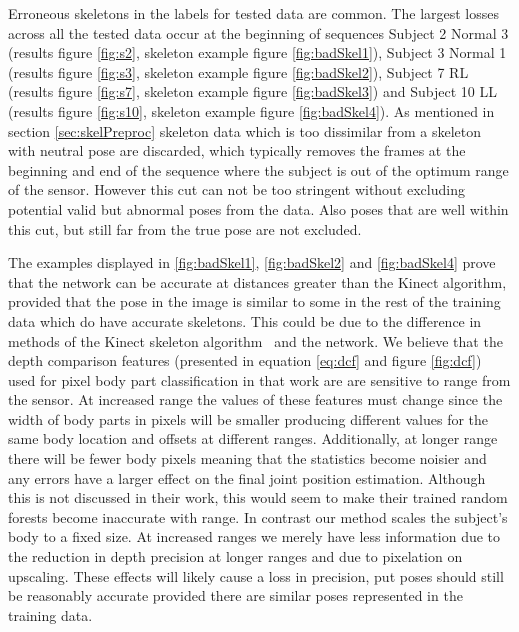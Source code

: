 \documentclass[11pt]{article} %
\begin{document}
Erroneous skeletons in the labels for tested data are common. The largest losses across all the tested data occur at the beginning of sequences Subject 2 Normal 3 (results figure \ref{fig:s2}, skeleton example figure \ref{fig:badSkel1}), Subject 3 Normal 1 (results figure \ref{fig:s3}, skeleton example figure \ref{fig:badSkel2}), Subject 7 RL (results figure \ref{fig:s7}, skeleton example figure \ref{fig:badSkel3}) and Subject 10 LL (results figure \ref{fig:s10}, skeleton example figure \ref{fig:badSkel4}). As mentioned in section \ref{sec:skelPreproc} skeleton data which is too dissimilar from a skeleton with neutral pose are discarded, which typically removes the frames at the beginning and end of the sequence where the subject is out of the optimum range of the sensor. However this cut can not be too stringent without excluding potential valid but abnormal poses from the data. Also poses that are well within this cut, but still far from the true pose are not excluded. 

The examples displayed in \ref{fig:badSkel1}, \ref{fig:badSkel2} and \ref{fig:badSkel4} prove that the network can be accurate at distances greater than the Kinect algorithm, provided that the pose in the image is similar to some in the rest of the training data which do have accurate skeletons. This could be due to the difference in methods of the Kinect skeleton algorithm~\cite{Shotton2012} and the network. We believe that the depth comparison features (presented in equation \ref{eq:dcf} and figure \ref{fig:dcf}) used for pixel body part classification in that work are are sensitive to range from the sensor. At increased range the values of these features must change since the width of body parts in pixels will be smaller producing different values for the same body location and offsets at different ranges. Additionally, at longer range there will be fewer body pixels meaning that the statistics become noisier and any errors have a larger effect on the final joint position estimation. Although this is not discussed in their work, this would seem to make their trained random forests become inaccurate with range. In contrast our method scales the subject's body to a fixed size. At increased ranges we merely have less information due to the reduction in depth precision at longer ranges and due to pixelation on upscaling. These effects will likely cause a loss in precision, put poses should still be reasonably accurate provided there are similar poses represented in the training data.
\end{document}
